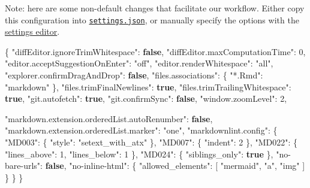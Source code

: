 \documentclass[
]{book}
\newenvironment{Shaded}{\begin{snugshade}}{\end{snugshade}}
\newcommand{\DataTypeTok}[1]{\textcolor[rgb]{0.13,0.29,0.53}{#1}}
\newcommand{\DecValTok}[1]{\textcolor[rgb]{0.00,0.00,0.81}{#1}}
\newcommand{\FunctionTok}[1]{\textcolor[rgb]{0.00,0.00,0.00}{#1}}
\newcommand{\KeywordTok}[1]{\textcolor[rgb]{0.13,0.29,0.53}{\textbf{#1}}}
\newcommand{\OtherTok}[1]{\textcolor[rgb]{0.56,0.35,0.01}{#1}}
\newcommand{\StringTok}[1]{\textcolor[rgb]{0.31,0.60,0.02}{#1}}
\begin{document}
\begin{itemize}
  Note: here are some non-default changes that facilitate our workflow. Either copy this configuration into \href{https://code.visualstudio.com/docs/getstarted/tips-and-tricks\#_tune-your-settings}{\texttt{settings.json}}, or manually specify the options with the \href{https://code.visualstudio.com/docs/getstarted/settings}{settings editor}.

\begin{Shaded}
\begin{Highlighting}[]
\FunctionTok{\{}
  \DataTypeTok{"diffEditor.ignoreTrimWhitespace"}\FunctionTok{:} \KeywordTok{false}\FunctionTok{,}
  \DataTypeTok{"diffEditor.maxComputationTime"}\FunctionTok{:} \DecValTok{0}\FunctionTok{,}
  \DataTypeTok{"editor.acceptSuggestionOnEnter"}\FunctionTok{:} \StringTok{"off"}\FunctionTok{,}
  \DataTypeTok{"editor.renderWhitespace"}\FunctionTok{:} \StringTok{"all"}\FunctionTok{,}
  \DataTypeTok{"explorer.confirmDragAndDrop"}\FunctionTok{:} \KeywordTok{false}\FunctionTok{,}
  \DataTypeTok{"files.associations"}\FunctionTok{:} \FunctionTok{\{}
      \DataTypeTok{"*.Rmd"}\FunctionTok{:} \StringTok{"markdown"}
  \FunctionTok{\},}
  \DataTypeTok{"files.trimFinalNewlines"}\FunctionTok{:} \KeywordTok{true}\FunctionTok{,}
  \DataTypeTok{"files.trimTrailingWhitespace"}\FunctionTok{:} \KeywordTok{true}\FunctionTok{,}
  \DataTypeTok{"git.autofetch"}\FunctionTok{:} \KeywordTok{true}\FunctionTok{,}
  \DataTypeTok{"git.confirmSync"}\FunctionTok{:} \KeywordTok{false}\FunctionTok{,}
  \DataTypeTok{"window.zoomLevel"}\FunctionTok{:} \DecValTok{2}\FunctionTok{,}

  \DataTypeTok{"markdown.extension.orderedList.autoRenumber"}\FunctionTok{:} \KeywordTok{false}\FunctionTok{,}
  \DataTypeTok{"markdown.extension.orderedList.marker"}\FunctionTok{:} \StringTok{"one"}\FunctionTok{,}
  \DataTypeTok{"markdownlint.config"}\FunctionTok{:} \FunctionTok{\{}
      \DataTypeTok{"MD003"}\FunctionTok{:} \FunctionTok{\{} \DataTypeTok{"style"}\FunctionTok{:} \StringTok{"setext\_with\_atx"} \FunctionTok{\},}
      \DataTypeTok{"MD007"}\FunctionTok{:} \FunctionTok{\{} \DataTypeTok{"indent"}\FunctionTok{:} \DecValTok{2} \FunctionTok{\},}
      \DataTypeTok{"MD022"}\FunctionTok{:} \FunctionTok{\{} \DataTypeTok{"lines\_above"}\FunctionTok{:} \DecValTok{1}\FunctionTok{,}
                 \DataTypeTok{"lines\_below"}\FunctionTok{:} \DecValTok{1} \FunctionTok{\},}
      \DataTypeTok{"MD024"}\FunctionTok{:} \FunctionTok{\{} \DataTypeTok{"siblings\_only"}\FunctionTok{:} \KeywordTok{true} \FunctionTok{\},}
      \DataTypeTok{"no{-}bare{-}urls"}\FunctionTok{:} \KeywordTok{false}\FunctionTok{,}
      \DataTypeTok{"no{-}inline{-}html"}\FunctionTok{:} \FunctionTok{\{}
        \DataTypeTok{"allowed\_elements"}\FunctionTok{:} \OtherTok{[}
          \StringTok{"mermaid"}\OtherTok{,}
          \StringTok{"a"}\OtherTok{,}
          \StringTok{"img"}
        \OtherTok{]}
      \FunctionTok{\}}
  \FunctionTok{\}}
\FunctionTok{\}}
\end{Highlighting}
\end{Shaded}


\end{itemize}
\end{document}
